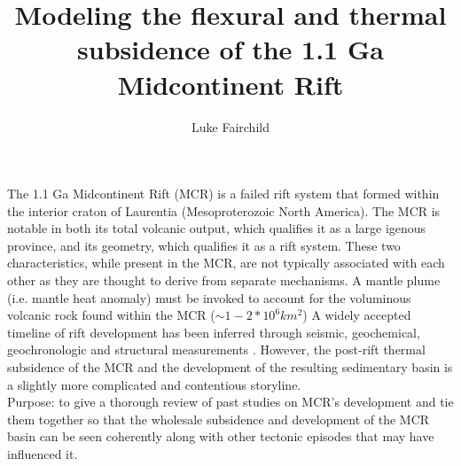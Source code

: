 \documentclass[11pt,a4paper]{article}
\title{Modeling the flexural and thermal subsidence of the 1.1 Ga Midcontinent Rift}
\author{Luke Fairchild}
\begin{document}
\maketitle{}
The 1.1 Ga Midcontinent Rift (MCR) is a failed rift system that formed within the interior craton of Laurentia (Mesoproterozoic North America). The MCR is notable in both its total volcanic output, which qualifies it as a large igenous province, and its geometry, which qualifies it as a rift system. These two characteristics, while present in the MCR, are not typically associated with each other as they are thought to derive from separate mechanisms. A mantle plume (i.e. mantle heat anomaly) must be invoked to account for the voluminous volcanic rock found within the MCR ($\sim 1-2*10^6 km^2$) A widely accepted timeline of rift development has been inferred through seismic, geochemical, geochronologic and structural measurements \cite{Cannon1989a,Stein2015a}. However, the post-rift thermal subsidence of the MCR and the development of the resulting sedimentary basin is a slightly more complicated and contentious storyline.  \\
Purpose: to give a thorough review of past studies on MCR's development and tie them together so that the wholesale subsidence and development of the MCR basin can be seen coherently along with other tectonic episodes that may have influenced it. 




\end{document}
